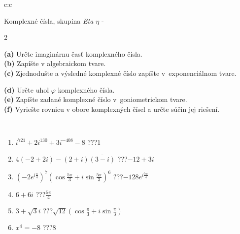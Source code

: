 \documentclass[10pt]{report}
\begin{document}
\begin{tabular}{c:c}
\begin{minipage}[c][104.5mm][t]{0.5\linewidth}
\begin{center}
\vspace{7mm}
{\huge Komplexné čísla, skupina \textit{Eta $\eta$} -}\\[5mm]
\begin{minipage}{0.95\linewidth}
\begin{center}
{\small \begin{multicols}{2} \raggedright
\textbf{(a)} Určte imaginárnu časť komplexného čísla. \\[1mm]
\textbf{(b)} Zapíšte v algebraickom tvare. \\[1mm]
\textbf{(c)} Zjednodušte a výsledné komplexné číslo zapíšte v~exponenciálnom tvare. \par \columnbreak
\textbf{(d)} Určte uhol \(\varphi\) komplexného čísla. \\[1mm]
\textbf{(e)} Zapíšte zadané komplexné číslo v~goniometrickom tvare. \\[1mm]
\textbf{(f)} Vyriešte rovnicu v obore komplexných čísel a určte súčin jej riešení.
\end{multicols}
}
\end{center}
\end{minipage}
\\[4mm]
\begin{minipage}{0.79\linewidth}
\begin{center}
\begin{varwidth}{\linewidth}
\begin{enumerate}
\large
\item $i^{721}+2i^{130}+3i^{-408}-8$\quad \dotfill\; ???\;\dotfill \quad $1$
\item $4(-2+2i)-(2+i)\overline{(3-i)}$\quad \dotfill\; ???\;\dotfill \quad $-12+3i$
\item $\left(-2e^{i\frac{\pi}{4}}\right)^{7}\left(\cos{\frac{5\pi}{3}}+i\sin{\frac{5\pi}{3}}\right)^{6}$\quad \dotfill\; ???\;\dotfill \quad $-128e^{i\frac{7\pi}{4}}$
\item $6+6i$\quad \dotfill\; ???\;\dotfill \quad $\frac{5\pi}{4}$
\item $3+\sqrt{3}i$\quad \dotfill\; ???\;\dotfill \quad $\sqrt{12}\left(\cos{\frac{\pi}{3}}+i\sin{\frac{\pi}{3}}\right)$
\item $x^4=-8$\quad \dotfill\; ???\;\dotfill \quad $8$
\end{enumerate}
\end{varwidth}

\end{center}
\end{minipage}
\end{center}
\end{minipage}
\end{tabular}
\end{document}
